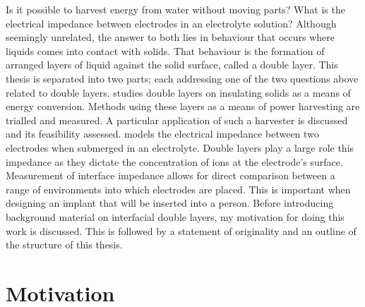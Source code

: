 



Is it possible to harvest energy from water without moving parts?
What is the electrical impedance between electrodes in an electrolyte solution?
Although seemingly unrelated, the answer to both lies in behaviour that occurs where liquids comes into contact with solids.
That behaviour is the formation of arranged layers of liquid against the solid surface, called a double layer.
This thesis is separated into two parts; each addressing one of the two questions above related to double layers.
 studies double layers on insulating solids as a means of energy conversion.
Methods using these layers as a means of power harvesting are trialled and measured.
A particular application of such a harvester is discussed and its feasibility assessed.
 models the electrical impedance between two electrodes when submerged in an electrolyte.
Double layers play a large role this impedance as they dictate the concentration of ions at the electrode's surface.
Measurement of interface impedance allows for direct comparison between a range of environments into which electrodes are placed.
This is important when designing an implant that will be inserted into a person.
Before introducing background material on interfacial double layers, my motivation for doing this work is discussed.
This is followed by a statement of originality and an outline of the structure of this thesis.


\section{Motivation}
  \label{sect:introduction_motiviation}


